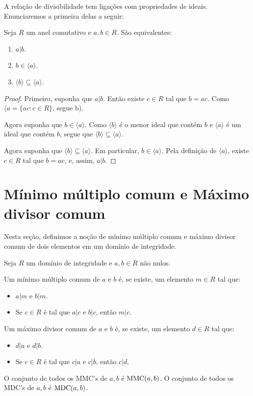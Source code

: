 A relação de divisibilidade tem ligações com propriedades de ideais.
Enunciaremos a primeira delas a seguir:

\begin{prop}
Seja $R$ um anel comutativo e $a, b \in R$.
São equivalentes:
\begin{enumerate}[label=\alph*)]
    \item $a|b$.
    \item $b \in \langle a \rangle$.
    \item $\langle b\rangle \subseteq \langle a \rangle$.
\end{enumerate}
\end{prop}
\begin{proof}
    Primeiro, suponha que $a|b$.
    Então existe $c \in R$ tal que $b=ac$.
    Como $\langle a=\{ac: c \in R\}$, segue b).

    Agora suponha que $b \in \langle a\rangle$.
    Como $\langle b\rangle$ é o menor ideal que contém $b$ e $\langle a\rangle$ é um ideal que contém $b$, segue que $\langle b\rangle \subseteq \langle a\rangle$.

    Agora suponha que $\langle b\rangle \subseteq \langle a\rangle$.
    Em particular, $b \in \langle a\rangle$.
    Pela definição de $\langle a \rangle$, existe $c \in R$ tal que $b=ac$, e, assim, $a|b$.
\end{proof}

\section{Mínimo múltiplo comum e Máximo divisor comum}

Nesta seção, definimos a noção de mínimo múltiplo comum e máximo divisor comum de dois elementos em um domínio de integridade.
\begin{definition}
Seja $R$ um domínio de integridade e $a, b \in R$ não nulos.

Um mínimo múltiplo comum de $a$ e $b$ é, se existe, um elemento $m\in R$ tal que:
\begin{itemize}
    \item $a|m$ e $b|m$.
    \item Se $c\in R$ é tal que $a|c$ e $b|c$, então $m|c$.
\end{itemize}

Um máximo divisor comum de $a$ e $b$ é, se existe, um elemento $d\in R$ tal que:
\begin{itemize}
    \item $d|a$ e $d|b$.
    \item Se $c\in R$ é tal que $c|a$ e $c|b$, então $c|d$.
\end{itemize}

O conjunto de todos os MMC's de $a, b$ é $\operatorname{MMC}(a, b)$.
O conjunto de todos os MDC's de $a, b$ é $\operatorname{MDC}(a, b)$.
\end{definition}


